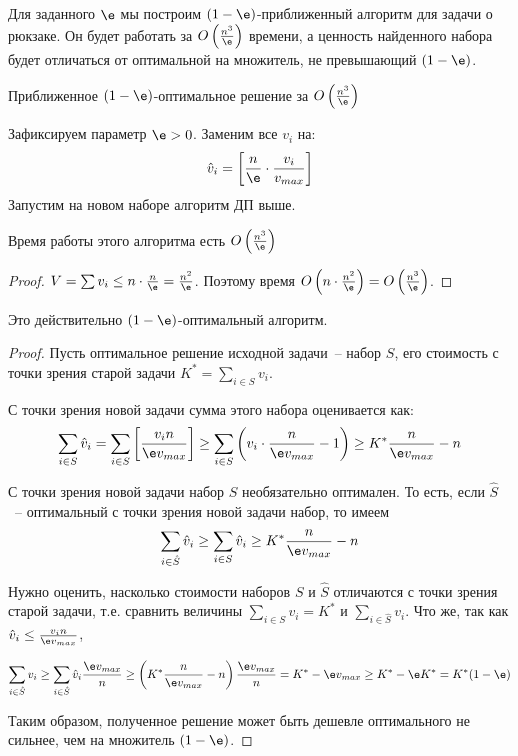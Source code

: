 Для заданного $\e$ мы построим $(1-\e)$-приближенный алгоритм для задачи о рюкзаке.
Он будет работать за $O\left(\frac{n^3}{\e}\right)$ времени, а ценность найденного набора будет отличаться от оптимальной на множитель, не превышающий $(1-\e)$.

\begin{algodescription}{Приближенное $(1-\e)$-оптимальное решение за $O\left(\frac{n^3}{\e}\right)$}

Зафиксируем параметр $\e>0$. Заменим все $v_i$ на: $$\hat{v}_i = \left[\frac{n}{\e} \cdot \frac{v_i}{v_{max}}\right]$$ Запустим на новом наборе алгоритм ДП выше.
\end{algodescription}

\begin{theorem*}
    Время работы этого алгоритма есть $O\left(\frac{n^3}{\e}\right)$
\end{theorem*}
\begin{proof}
    $V = \sum v_i \leq n\cdot \frac{n}{\e} = \frac{n^2}{\e}$. Поэтому время $O\left(n \cdot \frac{n^2}{\e}\right) = O\left(\frac{n^3}{\e}\right)$.
\end{proof}

\begin{theorem*}
    Это действительно $(1-\e)$-оптимальный алгоритм.
\end{theorem*}
\begin{proof}
Пусть оптимальное решение исходной задачи~-- набор $S$, его стоимость с точки зрения старой задачи $K^* = \sum\limits_{i\in S} v_i$.

С точки зрения новой задачи сумма этого набора оценивается как:
$$\sum_{i\in S}\hat{v}_i = \sum_{i\in S} \left[\frac{v_i n}{\e v_{max}}\right] \geq \sum_{i\in S} \left(v_i \cdot \frac{n}{\e v_{max}} - 1\right) \geq K^*\frac{n}{\e v_{max}} - n$$

С точки зрения новой задачи набор $S$ необязательно оптимален. То есть, если $\hat{S}$~-- оптимальный с точки зрения новой задачи набор, то имеем $$\sum_{i\in\hat S}\hat{v}_i \geq \sum_{i\in S} \hat{v}_i \geq K^*\frac{n}{\e v_{max}} - n$$

Нужно оценить, насколько стоимости наборов $S$ и $\hat S$ отличаются с точки зрения старой задачи, т.е. сравнить величины $\sum\limits_{i\in S}v_i = K^*$ и $\sum\limits_{i\in\hat S}v_i$. Что же, так как $\hat{v}_i \leq \frac{v_i n}{\e v_{max}}$,

$$\sum_{i\in\hat S}v_i \geq \sum_{i\in\hat S} \hat{v}_i \frac{\e v_{max}}{n} \geq \left(K^*\frac{n}{\e v_{max}} - n\right)\frac{\e v_{max}}{n} = K^* - \e v_{max} \geq K^* - \e K^* = K^*(1-\e)$$

Таким образом, полученное решение может быть дешевле оптимального не сильнее, чем на множитель $(1-\e)$.
\end{proof}
